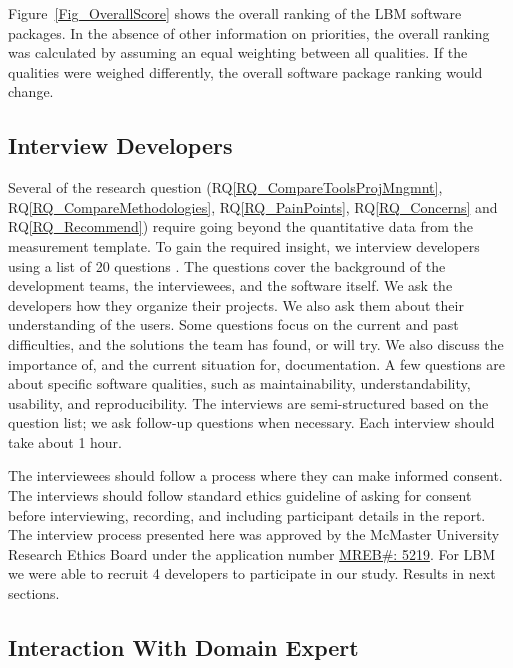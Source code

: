 \documentclass[runningheads]{llncs}
\newcommand{\rqref}[1]{RQ\ref{#1}}
\begin{document}
Figure~\ref{Fig_OverallScore} shows the overall ranking of the LBM software
packages. In the absence of other information on priorities, the overall ranking
was calculated by assuming an equal weighting between all qualities. If the
qualities were weighed differently, the overall software package ranking would
change.

\subsection{Interview Developers} \label{SecSurvey}

Several of the research question (\rqref{RQ_CompareToolsProjMngmnt},
\rqref{RQ_CompareMethodologies}, \rqref{RQ_PainPoints}, \rqref{RQ_Concerns} and
\rqref{RQ_Recommend}) require going beyond the quantitative data from the
measurement template. To gain the required insight, we interview developers
using a list of 20 questions \cite{SmithEtAl2021}. The questions cover the
background of the development teams, the interviewees, and the software itself.
We ask the developers how they organize their projects. We also ask them about
their understanding of the users. Some questions focus on the current and past
difficulties, and the solutions the team has found, or will try. We also discuss
the importance of, and the current situation for, documentation. A few questions
are about specific software qualities, such as maintainability,
understandability, usability, and reproducibility. The interviews are
semi-structured based on the question list; we ask follow-up questions when
necessary.  Each interview should take about 1 hour.

The interviewees should follow a process where they can make informed consent.
The interviews should follow standard ethics guideline of asking for consent
before interviewing, recording, and including participant details in the report.
The interview process presented here was approved by the McMaster University
Research Ethics Board under the application number 
\href{https://github.com/smiths/AIMSS/blob/master/StateOfPractice/MACREM/Application.pdf}
{MREB\#: 5219}.  For LBM we were able to recruit 4 developers to participate in
our study. Results in next sections.

\subsection{Interaction With Domain Expert} \label{sec_vet_software_list}
\end{document}
